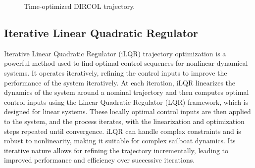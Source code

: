 \documentclass[conference]{IEEEtran}
\begin{document}
\begin{figure}[!ht]
    \centering
    \hspace{0mm}
    \caption{Time-optimized DIRCOL trajectory.}
    \label{fig:timeopt-dircol}
\end{figure}

\subsection{Iterative Linear Quadratic Regulator}
Iterative Linear Quadratic Regulator (iLQR) trajectory optimization is a powerful method used to find optimal control sequences for nonlinear dynamical systems. It operates iteratively, refining the control inputs to improve the performance of the system iteratively. At each iteration, iLQR linearizes the dynamics of the system around a nominal trajectory and then computes optimal control inputs using the Linear Quadratic Regulator (LQR) framework, which is designed for linear systems. These locally optimal control inputs are then applied to the system, and the process iterates, with the linearization and optimization steps repeated until convergence. iLQR can handle complex constraints and is robust to nonlinearity, making it suitable for complex sailboat dynamics. Its iterative nature allows for refining the trajectory incrementally, leading to improved performance and efficiency over successive iterations.
\end{document}
